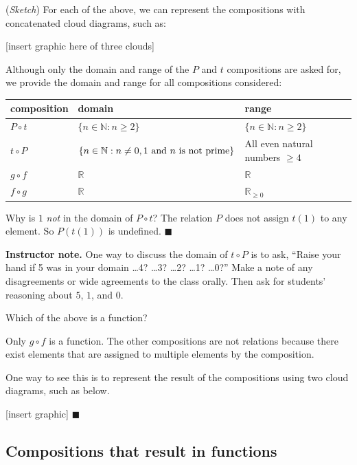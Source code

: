 \documentclass[11pt]{article}
\newcommand\smallnote[1]
	{\begin{mdframed}\raggedright  {\bf Instructor note.} {#1} \end{mdframed}}
\newenvironment{task}
	{\begin{mdframed}[linecolor=lightgray, linewidth=3pt]\raggedright}
	{\end{mdframed}}
\newcommand\tn{\textnormal}
\newcommand{\R}{\mathbb{R}}
\newcommand{\N}{\mathbb{N}}
\theoremstyle{definition}
\newenvironment{solution}{{\it Solution.} }{\hfill {\color{lightgray}$\blacksquare$}}
\begin{document}
\begin{solution}({\it Sketch})
For each of the above, we can represent the compositions with concatenated cloud diagrams, such as:

[insert graphic here of three clouds] 

Although only the domain and range of the $P$ and $t$ compositions are asked for, we provide the domain and range for all compositions considered: 
\begin{center}
\begin{tabular}{lll}
	composition & domain & range \\ 
	\hline
$P \circ t$ & $\{n\in \N: n \geq 2\}$ & $\{n\in \N: n\geq 2\}$\\ 
$t\circ P$ & $\{n\in \N: n\neq 0, 1 \tn{ and $n$ is not prime}\}$ & All even natural numbers $\geq 4$ \\ 
$g\circ f$ & $\R$ & $\R$ \\ 
$f\circ g$ &$\R$ & $\R_{\geq 0}$ 
\end{tabular}
\end{center}

Why is $1$ {\it not} in the domain of $P\circ t$? The relation $P$ does not assign $t(1)$ to any element. So $P(t(1))$ is undefined. 
\end{solution}


\smallnote{One way to discuss the domain of $t\circ P$ is to ask, ``Raise your hand if 5 was in your domain \dots 4? \dots 3? \dots 2? \dots 1? \dots 0?'' Make a note of any disagreements or wide agreements to the class orally. Then ask for students' reasoning about $5$, $1$, and $0$.}

\begin{task}
Which of the above is a function? 
\end{task}
\begin{solution}
Only $g\circ f$ is a function. The other compositions are not relations because there exist elements that are assigned to multiple elements by the composition. 

One way to see this is to represent the result of the compositions using two cloud diagrams, such as below.

[insert graphic]
\end{solution}

\subsection{Compositions that result in functions}
\end{document}
